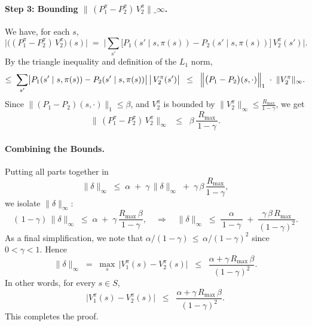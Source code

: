 \paragraph{Step 3: Bounding $\|\,(P_{1}^{\pi}-P_{2}^{\pi})\,V_{2}^{\pi}\|\_{\infty}$.}
We have, for each $s$,
\[
  \bigl|\bigl((P_{1}^{\pi}-P_{2}^{\pi})\,V_{2}^{\pi}\bigr)(s)\bigr|
  \;=\;
  \bigl|\sum_{s'}\bigl[P_{1}(s'\mid s,\pi(s))-P_{2}(s'\mid s,\pi(s))\bigr]
                \,V_{2}^{\pi}(s')\bigr|.
\]
By the triangle inequality and definition of the $L_1$ norm,
\[
  \le\;
  \sum_{s'}
  \bigl|P_{1}(s'\mid s,\pi(s)) - P_{2}(s'\mid s,\pi(s))\bigr|\,
  \bigl|\,V_{2}^{\pi}(s')\bigr|
  \;\;\le\;\;
  \Bigl\|\bigl(P_{1}-P_{2}\bigr)(s,\cdot)\Bigr\|_{1}\;\cdot\;\|V_{2}^{\pi}\|_{\infty}.
\]
Since $\|(P_{1}-P_{2})(s,\cdot)\|_{1}\le \beta$, and $V_{2}^{\pi}$ is bounded by 
$\|V_{2}^{\pi}\|_{\infty}\le \frac{R_{\max}}{1-\gamma}$, we get
\[
  \bigl\|\,(P_{1}^{\pi}-P_{2}^{\pi})\,V_{2}^{\pi}\bigr\|_{\infty}
  \;\;\le\;\;
  \beta\,\frac{R_{\max}}{\,1-\gamma\,}.
\]

\paragraph{Combining the Bounds.}
Putting all parts together in
\[
  \|\delta\|_{\infty}
  \;\le\;
  \alpha
  \;+\;\gamma\,\|\delta\|_{\infty}
  \;+\;\gamma\,\beta\,\frac{R_{\max}}{1-\gamma},
\]
we isolate $\|\delta\|_{\infty}$:
\[
  (\,1-\gamma)\,\|\delta\|_{\infty}
  \;\le\;
  \alpha
  \;+\;
  \gamma\,\frac{R_{\max}\,\beta}{\,1-\gamma\,},
  \quad\Longrightarrow\quad
  \|\delta\|_{\infty}
  \;\le\;
  \frac{\alpha}{\,1-\gamma\,}
  \;+\;
  \frac{\gamma\,\beta\,R_{\max}}{(1-\gamma)^2}.
\]
As a final simplification, we note that 
\(\alpha/(1-\gamma)\,\le\,\alpha/(1-\gamma)^2\) since $0<\gamma<1$. 
Hence 
\[
  \|\delta\|_{\infty}
  \;=\;\max_{s}\,\bigl|V_{1}^{\pi}(s)-V_{2}^{\pi}(s)\bigr|
  \;\;\le\;\;
  \frac{\alpha + \gamma\,R_{\max}\,\beta}{(1-\gamma)^2}.
\]
In other words, for every $s\in S$,
\[
  \bigl|V_{1}^{\pi}(s)-V_{2}^{\pi}(s)\bigr|
  \;\;\le\;\;
  \frac{\alpha + \gamma\,R_{\max}\,\beta}{(1-\gamma)^2}.
\]
This completes the proof.